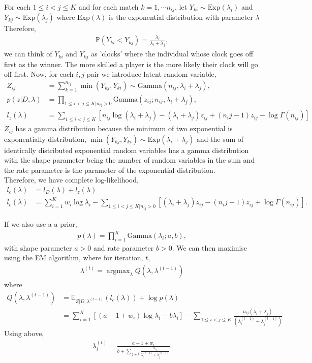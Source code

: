 \documentclass[11pt]{article}
\DeclareMathOperator*{\argmax}{argmax}
\numberwithin{equation}
{section}
\begin{document}
For each $1 \leq i<j \leq K$ and for each match $k=1, \cdots n_{ij}$, let $Y_{ki} \sim \mathrm{Exp} (\lambda_i)$ and $Y_{kj} \sim \mathrm{Exp}(\lambda_j)$ where $\mathrm{Exp}(\lambda)$ is the exponential distribution with parameter $\lambda$ Therefore, 
\begin{align}
\mathbb{P}(Y_{ki} < Y_{kj}) = \frac{\lambda_i}{\lambda_i + \lambda_j},
\end{align}
we can think of $Y_{ki}$ and $Y_{kj}$ as 'clocks' where the individual whose clock goes off first as the winner. The more skilled a player is the more likely their clock will go off first. Now, for each $i,j$ pair we introduce latent random variable, 
\begin{align} \label{latentrv}
Z_{ij} &= \sum _{k=1}^{n_{ij}} \min (Y_{kj},Y_{ki}) \sim \mathrm{Gamma} (n_{ij}, \lambda _i + \lambda _j),\\
p(z|D,\lambda) &= \prod _{1 \leq i<j \leq K | n_{ij} >0} \mathrm{Gamma} (z_{ij} ; n_{ij}, \lambda_i + \lambda_j), \\
l_z(\lambda) &= \sum _{1 \leq i<j \leq K}[n_{ij}\log (\lambda_i + \lambda_j) - (\lambda_i + \lambda_j)z_{ij} + (n_ij -1)z_{ij} - \log \Gamma (n_{ij})]
\end{align}
$Z_{ij}$ has a gamma distribution because the minimum of two exponential  is exponentially distribution, $\min (Y_{kj},Y_{ki}) \sim \mathrm{Exp}(\lambda _i + \lambda _j)$ and the sum of identically distributed exponential random variables has a gamma distribution with the shape parameter being the number of random variables in the sum and the rate parameter is the parameter of the exponential distribution. \\ 

Therefore, we have complete log-likelihood, 
\begin{align}
l_c(\lambda) &= l_D(\lambda) + l_z(\lambda) \\
l_c(\lambda) &= \sum _{i=1}^K w_i\log \lambda_i - \sum _{1 \leq i<j \leq K | n_{ij} >0} [(\lambda_i + \lambda_j)z_{ij} - (n_ij -1)z_{ij} + \log \Gamma (n_{ij})].
\end{align}

If we also use a a prior, 
\begin{align}
p(\lambda) = \prod _{i=1}^K \mathrm{Gamma}(\lambda_i ; a,b),
\end{align}
with shape parameter $a>0$ and rate parameter $b>0$. We can then maximise using the EM algorithm, where for iteration, $t$,
\begin{align}
\lambda^{(t)} = \argmax _{\lambda} Q(\lambda,\lambda^{(t-1)})
\end{align}
where 
\begin{align}
Q(\lambda,\lambda^{(t-1)}) &= \mathbb{E}_{Z|D, \lambda^{(t-1)}} (l_c(\lambda)) + \log p(\lambda) \\
&= \sum _{i=1}^K[(a-1+w_i)\log \lambda_i -b\lambda_i] - \sum _{1 \leq i<j \leq K} \frac{n_{ij}(\lambda_i + \lambda_j)}{(\lambda_i^{(t-1)} + \lambda_j^{(t-1)})}
\end{align}
Using above, 
\begin{align}
\lambda_i ^{(t)} = \frac{a-1+w_i}{b + \sum_{j \neq i}\frac{n_{ij}}{\lambda_i^{(t-1)}+\lambda_j^{(t-1)}}}.
\end{align}
\end{document}
